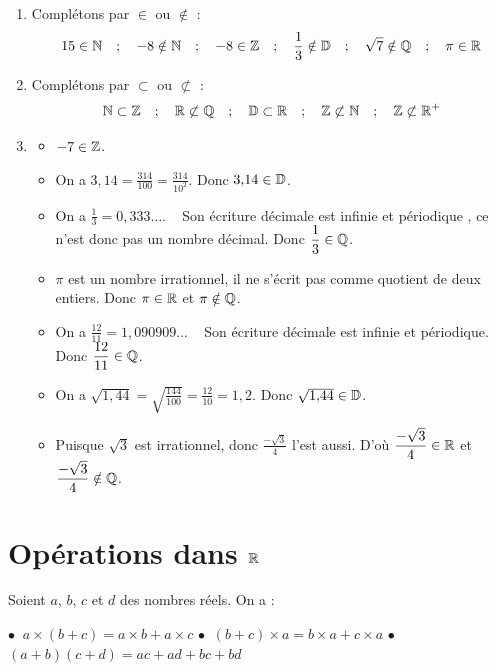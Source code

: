 \documentclass[10pt, a4paper]{article}
\begin{document}
\begin{Solution}[APPLICATION][1]
\begin{enumerate}
    \item Complétons par $\in$ ou $\notin$ :
    $$15 \in \mathbb{N} \quad ; \quad -8 \notin \mathbb{N} \quad ; \quad -8 \in \mathbb{Z} \quad ; \quad \dfrac{1}{3} \notin \mathbb{D} \quad ; \quad \sqrt{7} \notin \mathbb{Q} \quad ; \quad \pi \in \mathbb{R}$$

    \item Complétons par $\subset$ ou $\not\subset$ :
    $$\mathbb{N} \subset \mathbb{Z} \quad ; \quad \mathbb{R} \not\subset \mathbb{Q} \quad ; \quad \mathbb{D} \subset \mathbb{R} \quad ; \quad \mathbb{Z} \not\subset \mathbb{N} \quad ; \quad
    \mathbb{Z} \not\subset \mathbb{R}^+$$

    \item  \begin{itemize}
\item  $-7 \in \mathbb{Z}$.

\item On a $3{,}14 = \frac{314}{100} = \frac{314}{10^2}$. Donc $3{,}14 \in \mathbb{D}$.

\item On a $\frac{1}{3} = 0{,}333\ldots$. ~ Son écriture décimale est infinie et périodique , ce n'est donc pas un nombre décimal. 
Donc $\dfrac{1}{3} \in \mathbb{Q}$.

\item $\pi$ est un nombre irrationnel, il ne s'écrit pas comme quotient de deux entiers. Donc $\pi \in \mathbb{R}$ et $\pi \notin \mathbb{Q}$.

\item On a $\frac{12}{11} = 1{,}090909 ... $ ~ Son écriture décimale est infinie et périodique. Donc $\dfrac{12}{11} \in \mathbb{Q}$.

\item On a $\sqrt{1{,}44} = \sqrt{\frac{144}{100}} = \frac{12}{10} = 1{,}2$. Donc $\sqrt{1{,}44} \in \mathbb{D}$.

\item Puisque $\sqrt{3}$ est irrationnel, donc $\frac{-\sqrt{3}}{4}$ l'est aussi. D'où $\dfrac{-\sqrt{3}}{4} \in \mathbb{R}$ et $\dfrac{-\sqrt{3}}{4} \notin \mathbb{Q}$.
\end{itemize}
\end{enumerate}
\end{Solution}


\section{Opérations dans $\mathbb{R}$ }

\begin{Propriete}

Soient $a$, $b$, $c$  et $d$ des nombres réels. On a :
\vspace{0.2cm}

    $\bullet~$  $a \times (b+c) = a \times b + a \times c$ \hfill
    $\bullet~$  $(b+c) \times a = b \times a + c \times a$ \hfill
    $\bullet~$  $(a+b)(c+d) = ac + ad + bc + bd$
\end{Propriete}
\end{document}
